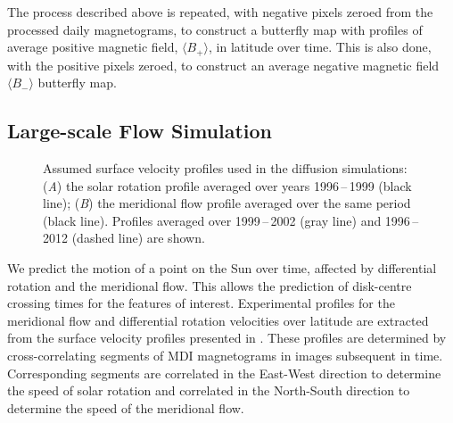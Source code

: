 The process described above is repeated, with negative pixels zeroed from the processed daily magnetograms, to construct a butterfly map with profiles of average positive magnetic field, $\langle B_{+} \rangle$, in latitude over time. This is also done, with the positive pixels zeroed, to construct an average negative magnetic field $\langle B_{-} \rangle$ butterfly map. %

\subsection{Large-scale Flow Simulation}\label{sect:meriddiffinteg}

\begin{figure}[!t]    %
\caption[Assumed surface velocity profiles for the diffusion simulations.]{Assumed surface velocity profiles used in the diffusion simulations: (\emph{A}) the solar rotation profile averaged over years 1996\,--\,1999 (black line); (\emph{B}) the meridional flow profile averaged over the same period (black line). Profiles averaged over 1999\,--\,2002 (gray line) and 1996\,--\,2012 (dashed line) are shown.} %
\label{fig:modelinput}
\end{figure}

We predict the motion of a point on the Sun over time, affected by differential rotation and the meridional flow. This allows the prediction of disk-centre crossing times for the features of interest.
Experimental profiles for the meridional flow and differential rotation velocities over latitude are extracted from the surface velocity profiles presented in \cite{Hathaway:2011}. These profiles are determined by cross-correlating segments of MDI magnetograms in images subsequent in time. Corresponding segments are correlated in the East-West direction to determine the speed of solar rotation and correlated in the North-South direction to determine the speed of the meridional flow.

